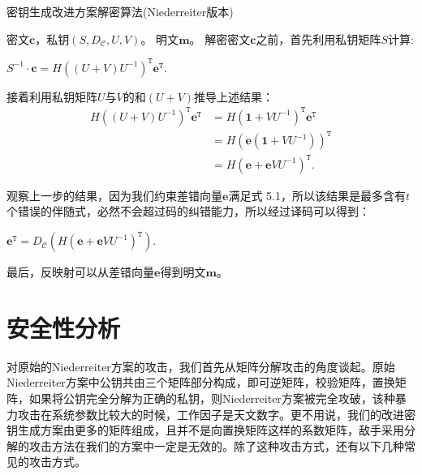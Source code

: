\begin{breakablealgorithm}
	\small
	\renewcommand{\algorithmicrequire}{\textbf{Input:}}
	\renewcommand{\algorithmicensure}{\textbf{Output:}}
	\caption{密钥生成改进方案解密算法(Niederreiter版本)}
	\label{alg:NewDeN}
	\begin{algorithmic}[1]
		\Require
		密文$\mathbf{c}$，私钥$(S,D_\mathcal{C},U,V)$。
		\Ensure
		明文$\mathbf{m}$。
		\State
		解密密文$\mathbf{c}$之前，首先利用私钥矩阵$S$计算:
		\begin{center}
			$S^{-1} \cdot \textbf{c} = H((U + V)U^{-1})^\mathtt{T}\mathbf{e}^\mathtt{T}.$
		\end{center}
		\State
		接着利用私钥矩阵$U$与$V$的和$(U + V)$推导上述结果：
		\begin{equation}
		\begin{aligned}
		H((U + V)U^{-1})^\mathtt{T}\mathbf{e}^\mathtt{T} &= H(\mathbf{1} +VU^{-1})^\mathtt{T}\mathbf{e}^\mathtt{T} \\
		& = H(\mathbf{e}(\mathbf{1} +VU^{-1}))^\mathtt{T} \\
		& = H(\mathbf{e} + \mathbf{e}VU^{-1})^\mathtt{T}.
		\end{aligned}
		\end{equation}
		
		\State
		观察上一步的结果，因为我们约束差错向量$\mathbf{e}$满足式 5.1，所以该结果是最多含有$t$个错误的伴随式，必然不会超过码的纠错能力，所以经过译码可以得到：
		\begin{center}
			$\mathbf{e} ^ \mathtt{T} = D_\mathcal{C}(H(\mathbf{e} + \mathbf{e}VU^{-1})^\mathtt{T}).$
		\end{center}
		
		\State
		最后，反映射可以从差错向量$\mathbf{e}$得到明文$\mathbf{m}$。		
	\end{algorithmic}
\end{breakablealgorithm}

\section{安全性分析}
对原始的Niederreiter方案的攻击，我们首先从矩阵分解攻击的角度谈起。原始Niederreiter方案中公钥共由三个矩阵部分构成，即可逆矩阵，校验矩阵，置换矩阵，如果将公钥完全分解为正确的私钥，则Niederreiter方案被完全攻破，该种暴力攻击在系统参数比较大的时候，工作因子是天文数字。更不用说，我们的改进密钥生成方案由更多的矩阵组成，且并不是向置换矩阵这样的系数矩阵，敌手采用分解的攻击方法在我们的方案中一定是无效的。除了这种攻击方式，还有以下几种常见的攻击方式。

